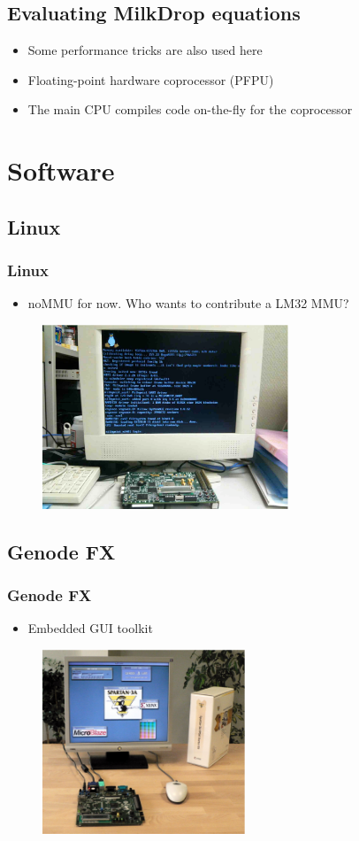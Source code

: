 \documentclass{beamer}
\begin{document}
\subsection{Evaluating MilkDrop equations}
\frame
{
  \begin{center}
  \end{center}
  \begin{itemize}
  \item Some performance tricks are also used here
  \item Floating-point hardware coprocessor (PFPU)
  \item The main CPU compiles code on-the-fly for the coprocessor
  \end{itemize}
}

\section{Software}
\subsection{Linux}
\frame
{
  \frametitle{Linux}
  \begin{itemize}
  \item noMMU for now. Who wants to contribute a LM32 MMU?
  \end{itemize}
  \begin{figure}[H]
  \includegraphics[height=55mm]{linux.eps}
  \end{figure}
}

\subsection{Genode FX}
\frame
{
  \frametitle{Genode FX}
  \begin{itemize}
  \item Embedded GUI toolkit
  \end{itemize}
  \begin{figure}[H]
  \includegraphics[height=55mm]{genode.eps}
  \end{figure}
}
\end{document}
